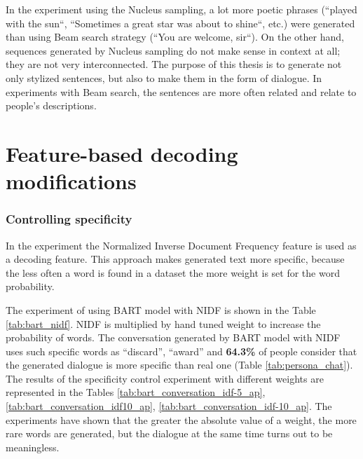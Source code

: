 In the experiment using the Nucleus sampling, a lot more poetic phrases (``played with the sun``, ``Sometimes a great star was about to shine``, etc.) were generated than using Beam search strategy (``You are welcome, sir``). On the other hand, sequences generated by Nucleus sampling do not make sense in context at all; they are not very interconnected. The purpose of this thesis is to generate not only stylized sentences, but also to make them in the form of dialogue. In experiments with Beam search, the sentences are more often related and relate to people’s descriptions.

\section{Feature-based decoding modifications}
\subsubsection{Controlling specificity}

In the experiment the Normalized Inverse Document Frequency feature is used as a decoding feature. This approach makes generated text more specific, because the less often a word is found in a dataset the more weight is set for the word probability. 

The experiment of using BART model with NIDF is shown in the Table \ref{tab:bart_nidf}. NIDF is multiplied by hand tuned weight to increase the probability of words. The conversation generated by BART model with NIDF uses such specific words as ``discard'', ``award'' and \textbf{64.3\%} of people consider that the generated dialogue is more specific than real one (Table \ref{tab:persona_chat}). The results of the specificity control experiment with different weights are represented in the Tables \ref{tab:bart_conversation_idf-5_ap}, \ref{tab:bart_conversation_idf10_ap}, \ref{tab:bart_conversation_idf-10_ap}. The experiments have shown that the greater the absolute value of a weight, the more rare words are generated, but the dialogue at the same time turns out to be meaningless.

